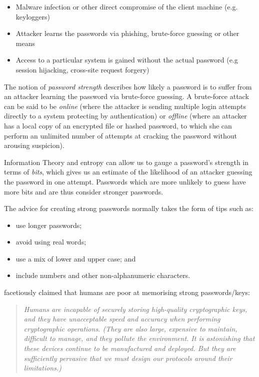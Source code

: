 \documentclass{report}
\begin{document}
\begin{itemize}
  \item Malware infection or other direct compromise of the client machine (e.g. keyloggers)
  \item Attacker learns the passwords via phishing, brute-force guessing or other means
  \item Access to a particular system is gained without the actual password (e.g session hijacking, cross-site request forgery)
\end{itemize}

The notion of \emph{password strength} describes how likely
a password is to suffer from an attacker learning the password via brute-force
guessing. A brute-force attack can be said to be \emph{online} (where the
attacker is sending multiple login attempts directly to a system protecting
by authentication) or \emph{offline} (where an attacker has a local copy of
an encrypted file or hashed password, to which she can perform an unlimited
number of attempts at cracking the password without arousing suspicion).

Information Theory and entropy can allow us to gauge a password's strength
in terms of \emph{bits}, which gives us an estimate of the likelihood of
an attacker guessing the password in one attempt. Passwords which are
more unlikely to guess have more bits and are thus consider stronger passwords.

The advice for creating strong passwords normally takes the form of tips
such as:

\begin{itemize}
  \item use longer passwords;
  \item avoid using real words;
  \item use a mix of lower and upper case; and
  \item include numbers and other non-alphanumeric characters.
\end{itemize}

\cite{kaufman2002network} facetiously claimed that humans are poor
at memorising strong passwords/keys:

\begin{quotation}
  \emph{
  Humans are incapable of securely storing high-quality
  cryptographic keys, and they have unacceptable speed and
  accuracy when performing cryptographic operations. (They are
  also large, expensive to maintain, difficult to manage, and they
  pollute the environment. It is astonishing that these devices
  continue to be manufactured and deployed. But they are
  sufficiently pervasive that we must design our protocols around
  their limitations.)
  }
\end{quotation}
\end{document}
